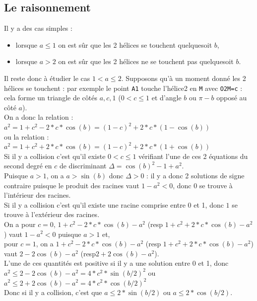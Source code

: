 \documentclass[a4paper,11pt]{book}
\begin{document}
\subsection{Le raisonnement}
Il y a des cas simples :
\begin{itemize}
\item lorsque $a\leq 1$ on est s\^ur que les 2 h\'elices se touchent 
quelquesoit $b$,
\item lorsque $a>2$ on est s\^ur que les 2 h\'elices ne se touchent pas 
quelquesoit $b$.
\end{itemize}

Il reste donc \`a \'etudier le cas $1<a\leq 2$.
Supposons qu'\`a un moment donn\'e les 2 h\'elices se touchent : par exemple 
le point {\tt A1} touche l'h\'elice2 en {\tt M} avec {\tt O2M=c} : cela forme 
un triangle de c\^ot\'es 
$a,c,1$ ($0<c\leq 1$ et d'angle $b$ ou $\pi-b$ oppos\'e au  c\^ot\'e $a$).\\
On a donc la relation :\\
$a^2=1+c^2-2*c*\cos(b)=(1-c)^2+2*c*(1-\cos(b))$\\
ou la relation :\\
$a^2=1+c^2+2*c*\cos(b)=(1-c)^2+2*c*(1+\cos(b))$\\
Si il y a collision c'est qu'il existe $0<c \leq 1$ v\'erifiant l'une de ces 2
\'equations du second degr\'e en $c$ de discriminant 
$\Delta=\cos(b)^2-1+a^2$.\\
Puisque $a>1$, on a  $a>\sin(b)$ donc $\Delta>0$ : il y a donc 2 solutions de 
signe contraire puisque le produit des racines vaut $1-a^2<0$, donc $0$ se 
trouve \`a l'int\'erieur des racines.\\
Si il y a collision c'est qu'il existe une racine comprise entre 0 et 1, donc 
$1$ se trouve \`a l'ext\'erieur des racines.\\
On a pour $c=0$, $1+c^2-2*c*\cos(b)-a^2$ (resp $1+c^2+2*c*\cos(b)-a^2$)
vaut $1-a^2<0$ puisque $a>1$ et,\\
pour $c=1$, on a $1+c^2-2*c*\cos(b)-a^2$ (resp $1+c^2+2*c*\cos(b)-a^2$)
vaut $2- 2\cos(b)-a^2$ (resp$2+ 2\cos(b)-a^2$).\\
L'une de ces quantit\'es est positive si il y a une solution entre 0 et 1, 
donc \\
$a^2 \leq 2-2\cos(b)-a^2=4*c^2*\sin(b/2)^2$ ou \\
$a^2 \leq 2+2\cos(b)-a^2=4*c^2*\cos(b/2)^2$\\
Donc si il y a collision, c'est que $a\leq 2*\sin(b/2)$ ou 
$a\leq 2*\cos(b/2)$.\\
\end{document}
